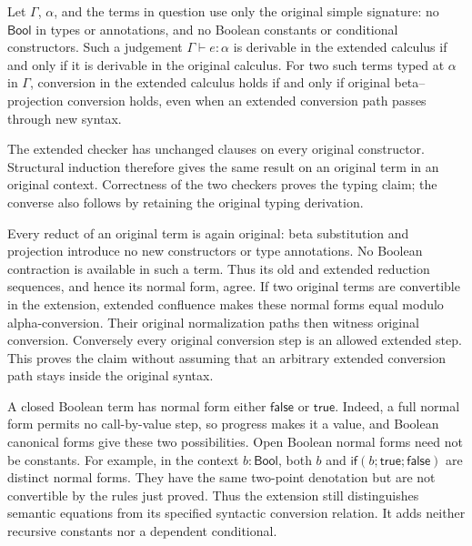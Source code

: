 \begin{proposition}
Let $\Gamma$, $\alpha$, and the terms in question use only the original
simple signature: no $\mathsf{Bool}$ in types or annotations, and no
Boolean constants or conditional constructors. Such a judgement
$\Gamma\vdash e:\alpha$ is derivable in the extended calculus if and
only if it is derivable in the original calculus. For two such terms
typed at $\alpha$ in $\Gamma$, conversion in the extended calculus
holds if and only if original beta--projection conversion holds,
even when an extended conversion path passes through new syntax.
\end{proposition}
\Proof
The extended checker has unchanged clauses on every original
constructor. Structural induction therefore gives the same result
on an original term in an original context. Correctness of the two
checkers proves the typing claim; the converse also follows by
retaining the original typing derivation.

Every reduct of an original term is again original: beta substitution
and projection introduce no new constructors or type annotations.
No Boolean contraction is available in such a term. Thus its old
and extended reduction sequences, and hence its normal form, agree.
If two original terms are convertible in the extension, extended
confluence makes these normal forms equal modulo alpha-conversion.
Their original normalization paths then witness original conversion.
Conversely every original conversion step is an allowed extended
step. This proves the claim without assuming that an arbitrary
extended conversion path stays inside the original syntax.
\Done

A closed Boolean term has normal form either $\mathsf{false}$ or
$\mathsf{true}$. Indeed, a full normal form permits no call-by-value
step, so progress makes it a value, and Boolean canonical forms give
these two possibilities. Open Boolean normal forms need not be
constants. For example, in the context $b:\mathsf{Bool}$, both $b$
and $\mathsf{if}(b;\mathsf{true};\mathsf{false})$ are distinct normal
forms. They have the same two-point denotation but are not convertible
by the rules just proved. Thus the extension still distinguishes
semantic equations from its specified syntactic conversion relation.
It adds neither recursive constants nor a dependent conditional.

